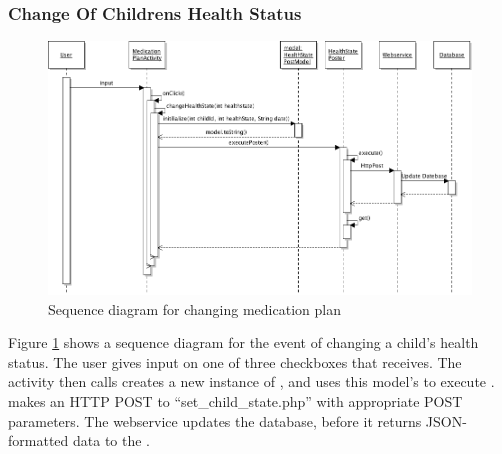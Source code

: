 \subsubsection{Change Of Childrens Health Status}
\begin{figure}[h!]
	\centering
		\includegraphics[width = 17.5 cm]{Pictures/ArchPictures/gapparchpictures/sequence_health_state.png}
	\caption{Sequence diagram for changing medication plan}
	\label{fig:seq-diagram-healthstate}
\end{figure}
Figure \ref{fig:seq-diagram-healthstate} shows a sequence diagram for the event of changing
a child's health status. The user gives input on one of three checkboxes that  receives. The activity then calls creates 
a new instance of , and uses this model's  to execute .  makes an HTTP POST to ``set\_child\_state.php'' with 
appropriate POST parameters. The webservice updates the database, before it returns JSON-formatted data to the .

